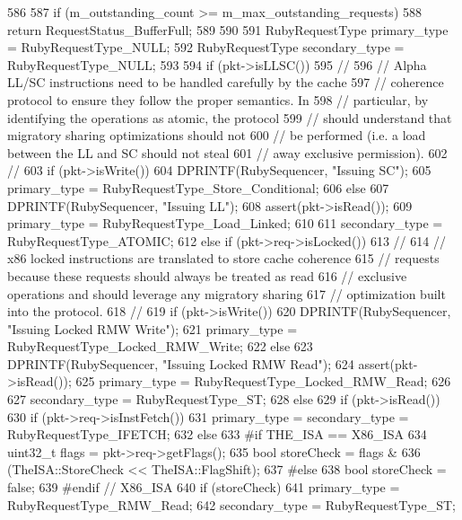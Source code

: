 \begin{DoxyCode}
586 {
587     if (m_outstanding_count >= m_max_outstanding_requests) {
588         return RequestStatus_BufferFull;
589     }
590 
591     RubyRequestType primary_type = RubyRequestType_NULL;
592     RubyRequestType secondary_type = RubyRequestType_NULL;
593 
594     if (pkt->isLLSC()) {
595         //
596         // Alpha LL/SC instructions need to be handled carefully by the cache
597         // coherence protocol to ensure they follow the proper semantics. In
598         // particular, by identifying the operations as atomic, the protocol
599         // should understand that migratory sharing optimizations should not
600         // be performed (i.e. a load between the LL and SC should not steal
601         // away exclusive permission).
602         //
603         if (pkt->isWrite()) {
604             DPRINTF(RubySequencer, "Issuing SC\n");
605             primary_type = RubyRequestType_Store_Conditional;
606         } else {
607             DPRINTF(RubySequencer, "Issuing LL\n");
608             assert(pkt->isRead());
609             primary_type = RubyRequestType_Load_Linked;
610         }
611         secondary_type = RubyRequestType_ATOMIC;
612     } else if (pkt->req->isLocked()) {
613         //
614         // x86 locked instructions are translated to store cache coherence
615         // requests because these requests should always be treated as read
616         // exclusive operations and should leverage any migratory sharing
617         // optimization built into the protocol.
618         //
619         if (pkt->isWrite()) {
620             DPRINTF(RubySequencer, "Issuing Locked RMW Write\n");
621             primary_type = RubyRequestType_Locked_RMW_Write;
622         } else {
623             DPRINTF(RubySequencer, "Issuing Locked RMW Read\n");
624             assert(pkt->isRead());
625             primary_type = RubyRequestType_Locked_RMW_Read;
626         }
627         secondary_type = RubyRequestType_ST;
628     } else {
629         if (pkt->isRead()) {
630             if (pkt->req->isInstFetch()) {
631                 primary_type = secondary_type = RubyRequestType_IFETCH;
632             } else {
633 #if THE_ISA == X86_ISA
634                 uint32_t flags = pkt->req->getFlags();
635                 bool storeCheck = flags &
636                         (TheISA::StoreCheck << TheISA::FlagShift);
637 #else
638                 bool storeCheck = false;
639 #endif // X86_ISA
640                 if (storeCheck) {
641                     primary_type = RubyRequestType_RMW_Read;
642                     secondary_type = RubyRequestType_ST;
}}}}}
\end{DoxyCode}
